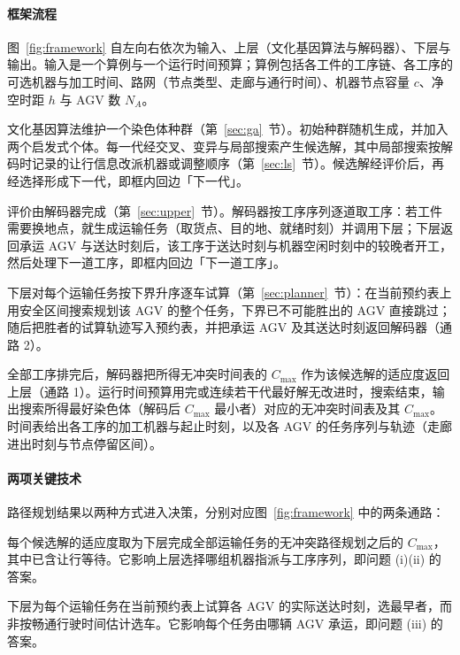 \documentclass[manuscript,screen,review]{acmart}
\begin{document}
\paragraph{框架流程}
图~\ref{fig:framework} 自左向右依次为输入、上层（文化基因算法与解码器）、下层与输出。输入是一个算例与一个运行时间预算；算例包括各工件的工序链、各工序的可选机器与加工时间、路网（节点类型、走廊与通行时间）、机器节点容量 $c$、净空时距 $h$ 与 AGV 数 $N_A$。

文化基因算法维护一个染色体种群（第~\ref{sec:ga}~节）。初始种群随机生成，并加入两个启发式个体。每一代经交叉、变异与局部搜索产生候选解，其中局部搜索按解码时记录的让行信息改派机器或调整顺序（第~\ref{sec:ls}~节）。候选解经评价后，再经选择形成下一代，即框内回边「下一代」。

评价由解码器完成（第~\ref{sec:upper}~节）。解码器按工序序列逐道取工序：若工件需要换地点，就生成运输任务（取货点、目的地、就绪时刻）并调用下层；下层返回承运 AGV 与送达时刻后，该工序于送达时刻与机器空闲时刻中的较晚者开工，然后处理下一道工序，即框内回边「下一道工序」。

下层对每个运输任务按下界升序逐车试算（第~\ref{sec:planner}~节）：在当前预约表上用安全区间搜索规划该 AGV 的整个任务，下界已不可能胜出的 AGV 直接跳过；随后把胜者的试算轨迹写入预约表，并把承运 AGV 及其送达时刻返回解码器（通路 2）。

全部工序排完后，解码器把所得无冲突时间表的 $C_{\max}$ 作为该候选解的适应度返回上层（通路 1）。运行时间预算用完或连续若干代最好解无改进时，搜索结束，输出搜索所得最好染色体（解码后 $C_{\max}$ 最小者）对应的无冲突时间表及其 $C_{\max}$。时间表给出各工序的加工机器与起止时刻，以及各 AGV 的任务序列与轨迹（走廊进出时刻与节点停留区间）。

\paragraph{两项关键技术}
路径规划结果以两种方式进入决策，分别对应图~\ref{fig:framework} 中的两条通路：
\begin{description}[leftmargin=0pt,topsep=3pt,itemsep=3pt]
  \item[路径规划内嵌评价（通路 1）。]
  每个候选解的适应度取为下层完成全部运输任务的无冲突路径规划之后的 $C_{\max}$，其中已含让行等待。它影响上层选择哪组机器指派与工序序列，即问题 (i)(ii) 的答案。
  \item[预约表感知派遣（通路 2）。]
  下层为每个运输任务在当前预约表上试算各 AGV 的实际送达时刻，选最早者，而非按畅通行驶时间估计选车。它影响每个任务由哪辆 AGV 承运，即问题 (iii) 的答案。
\end{description}
\end{document}

